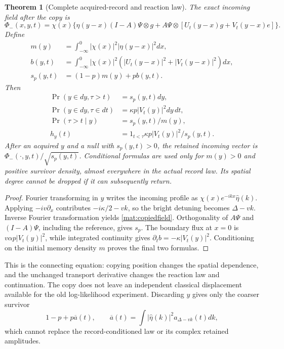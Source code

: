 \documentclass[11pt,oneside,openany]{book}
\newtheorem{theorem}{Theorem}[chapter]
\theoremstyle{definition}
\theoremstyle{remark}\newtheorem{remark}[theorem]{Remark}
\begin{document}
\begin{theorem}[Complete acquired-record and reaction law]
\label{mat:copytheorem}
The exact incoming field after the copy is
\begin{equation}
 \Phi_-(x,y,t)=\chi(x)\{\eta(y-x)(I-A)\Psi\otimes g+
       A\Psi\otimes[U_t(y-x)g+V_t(y-x)e]\}.
 \label{mat:copiedfield}
\end{equation}
Define
\begin{align}
 m(y)&=\int_{-\infty}^0|\chi(x)|^2|\eta(y-x)|^2dx,\\
 b(y,t)&=\int_{-\infty}^0|\chi(x)|^2
                 (|U_t(y-x)|^2+|V_t(y-x)|^2)dx,\\
 s_p(y,t)&=(1-p)m(y)+pb(y,t).
\end{align}
Then
\begin{align}
 \Pr(y\in dy,\tau>t)&=s_p(y,t)dy,\\
 \Pr(y\in dy,\tau\in dt)&=\kappa p|V_t(y)|^2dy\,dt,\\
 \Pr(\tau>t\mid y)&=s_p(y,t)/m(y),\\
 h_y(t)&=1_{t<\tau}\kappa p|V_t(y)|^2/s_p(y,t).
 \label{mat:copylaw}
\end{align}
After an acquired $y$ and a null with $s_p(y,t)>0$, the retained incoming vector is $\Phi_-(\cdot,y,t)/\sqrt{s_p(y,t)}$. Conditional formulas are used only for $m(y)>0$ and positive survivor density, almost everywhere in the actual record law. Its spatial degree cannot be dropped if it can subsequently return.
\end{theorem}
\begin{proof}
Fourier transforming in $y$ writes the incoming profile as $\chi(x)e^{-ikx}\widehat\eta(k)$. Applying $-iv\partial_x$ contributes $-i\kappa/2-vk$, so the bright detuning becomes $\Delta-vk$. Inverse Fourier transformation yields \eqref{mat:copiedfield}. Orthogonality of $A\Psi$ and $(I-A)\Psi$, including the reference, gives $s_p$. The boundary flux at $x=0$ is $v\alpha p|V_t(y)|^2$, while integrated continuity gives $\partial_tb=-\kappa|V_t(y)|^2$. Conditioning on the initial memory density $m$ proves the final two formulas.
\end{proof}

This is the connecting equation: copying position changes the spatial dependence, and the unchanged transport derivative changes the reaction law and continuation. The copy does not leave an independent classical displacement available for the old log-likelihood experiment. Discarding $y$ gives only the coarser survivor
\[
 1-p+p\overline a(t),\qquad
 \overline a(t)=\int|\widehat\eta(k)|^2a_{\Delta-vk}(t)dk,
\]
which cannot replace the record-conditioned law or its complex retained amplitudes.
\end{document}
